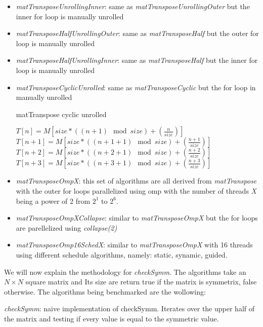 \documentclass[conference]{IEEEtran}
\begin{document}
\begin{itemize}
\item \textit{matTransposeUnrollingInner}: same as \textit{matTransposeUnrollingOuter} but the inner for loop is manually unrolled

\item \textit{matTransposeHalfUnrollingOuter}: same as \textit{matTransposeHalf} but the outer for loop is manually unrolled

\item \textit{matTransposeHalfUnrollingInner}: same as \textit{matTransposeHalf} but the inner for loop is manually unrolled

\item \textit{matTransposeCyclicUnrolled}: same as \textit{matTransposeCyclic} but the for loop in manually unrolled

  \begin{algorithm}
    \caption{matTranspose cyclic unrolled}\label{matTranspose}
    \begin{algoritmic}[1]
        $T[n] = M[size * ((n+1) \mod size ) + (\frac{n}{size})]$
        $T[n+1] = M[size * ((n+1+1) \mod size ) + (\frac{n+1}{size})]$
        $T[n+2] = M[size * ((n+2+1) \mod size ) + (\frac{n+2}{size})]$
        $T[n+3] = M[size * ((n+3+1) \mod size ) + (\frac{n+3}{size})]$
        \EndFor
      \EndProcedure
    \end{algoritmic}
  \end{algorithm}
  
\item \textit{matTransposeOmpX}: this set of algorithms are all derived from \textit{matTranspose} with the outer for loops parallelized using omp with the number of threads \textit{X} being a power of 2 from $2^1$ to $2^6$.

\item \textit{matTransposeOmpXCollapse}: similar to \textit{matTransposeOmpX} but the for loops are parellelized using \textit{collapse(2)}
  
\item \textit{matTransposeOmp16SchedX}: similar to \textit{matTransposeOmpX} with 16 threads using different schedule algorithms, namely: static, synamic, guided.
\end{itemize}

We will now explain the methodology for \textit{checkSymm}. The algorithms take an $N \times N$ square matrix and Its size are return true if the matrix is symmetrix, false otherwise.
The algorithms being benchmarked are the wollowing:
\item \textit{checkSymm}: naive implementation of checkSymm. Iterates over the upper half of the matrix and testing if every value is equal to the symmetric value.
\end{document}
